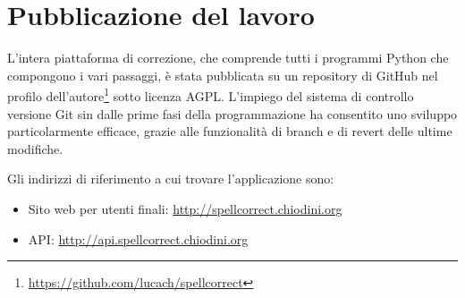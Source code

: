 \section{Pubblicazione del lavoro}
\label{pubb}
L'intera piattaforma di correzione, che comprende tutti i programmi Python che compongono i vari passaggi, è stata pubblicata su un repository di GitHub nel profilo dell'autore\footnote{\url{https://github.com/lucach/spellcorrect}} sotto licenza AGPL. L'impiego del sistema di controllo versione Git sin dalle prime fasi della programmazione ha consentito uno sviluppo particolarmente efficace, grazie alle funzionalità di branch e di revert delle ultime modifiche.

Gli indirizzi di riferimento a cui trovare l'applicazione sono:

\begin{itemize}
\item Sito web per utenti finali: \url{http://spellcorrect.chiodini.org}
\item API: \url{http://api.spellcorrect.chiodini.org}
\end{itemize}